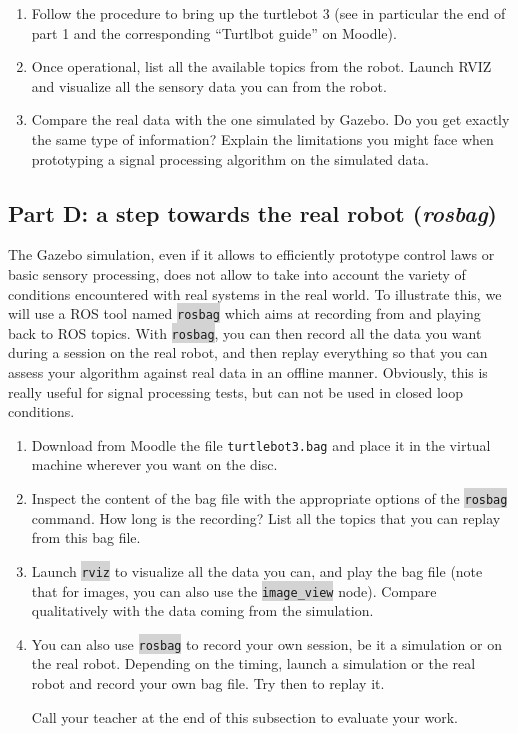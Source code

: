 \documentclass[10pt,a4paper]{upmc}
\newcounter{mainmemorder}
\newcommand{\save}{\setcounter{mainmemorder}{\value{enumi}}}
\newcommand{\load}{\setcounter{enumi}{\value{mainmemorder}}}
\newcommand{\mytext}[1]{\colorbox{lightgray}{\texttt{#1}}}
\newcommand{\subsecline}{\texorpdfstring{\hrulefill}{}}
\begin{document}
\begin{enumerate}
  \load
  \item Follow the procedure to bring up the turtlebot 3 (see in particular the end of part 1 and
        the corresponding ``Turtlbot guide'' on Moodle).
  \item Once operational, list all the available topics from the robot. Launch RVIZ and visualize
        all the sensory data you can from the robot.
  \item Compare the real data with the one simulated by Gazebo. Do you get exactly the same type of
        information? Explain the limitations you might face when prototyping a signal processing algorithm
        on the simulated data.
  \save
\end{enumerate}

\subsection{Part D: a step towards the real robot (\textit{rosbag}) \subsecline}
\label{subsec:rosbag}

The Gazebo simulation, even if it allows to efficiently prototype control laws or basic sensory
processing, does not allow to take into account the variety of conditions encountered with real
systems in the real world. To illustrate this, we will use a ROS tool named \mytext{rosbag} which
aims at recording from and playing back to ROS topics. With \mytext{rosbag}, you can then record all
the data you want during a session on the real robot, and then replay everything so that you can
assess your algorithm against real data in an offline manner. Obviously, this is really useful for
signal processing tests, but can not be used in closed loop conditions.

\begin{enumerate}
  \load
  \item Download from Moodle the file \texttt{turtlebot3.bag} and place it in the virtual machine
        wherever you want on the disc.

  \item Inspect the content of the bag file with the appropriate options of the \mytext{rosbag}
        command. How long is the recording? List all the topics that you can replay from this bag file.
  \item Launch \mytext{rviz} to visualize all the data you can, and play the bag file (note that for
        images, you can also use the \mytext{image\_view} node). Compare qualitatively with the data
        coming from the simulation.
  \item You can also use \mytext{rosbag} to record your own session, be it a simulation or on the
        real robot. Depending on the timing, launch a simulation or the real robot and record your own bag
        file. Try then to replay it.

        \begin{mdframed}[style=evaluation]
          Call your teacher at the end of this subsection to evaluate your work.
        \end{mdframed}

\end{enumerate}
\end{document}
